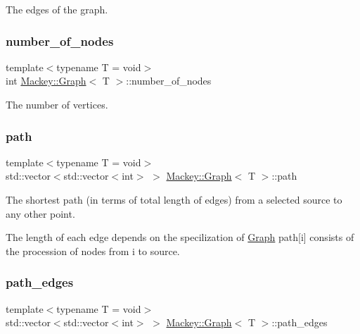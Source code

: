 The edges of the graph. 

\mbox{\label{classMackey_1_1Graph_a6b275a20b0571d4b51fbfa3e596cd67a}} 
\subsubsection{\texorpdfstring{number\+\_\+of\+\_\+nodes}{number\_of\_nodes}}
{\footnotesize\ttfamily template$<$typename T = void$>$ \\
int \hyperlink{classMackey_1_1Graph}{Mackey\+::\+Graph}$<$ T $>$\+::number\+\_\+of\+\_\+nodes}



The number of vertices. 

\mbox{\label{classMackey_1_1Graph_a66fac95e623ca6e3e85ec33310755831}} 
\subsubsection{\texorpdfstring{path}{path}}
{\footnotesize\ttfamily template$<$typename T = void$>$ \\
std\+::vector$<$std\+::vector$<$int$>$ $>$ \hyperlink{classMackey_1_1Graph}{Mackey\+::\+Graph}$<$ T $>$\+::path}



The shortest path (in terms of total length of edges) from a selected source to any other point. 

The length of each edge depends on the specilization of \hyperlink{classMackey_1_1Graph}{Graph} path\mbox{[}i\mbox{]} consists of the procession of nodes from i to source. \mbox{\label{classMackey_1_1Graph_ae704812b28d290b7d3742ea3745b5edf}} 
\subsubsection{\texorpdfstring{path\+\_\+edges}{path\_edges}}
{\footnotesize\ttfamily template$<$typename T = void$>$ \\
std\+::vector$<$std\+::vector$<$int$>$ $>$ \hyperlink{classMackey_1_1Graph}{Mackey\+::\+Graph}$<$ T $>$\+::path\+\_\+edges}



